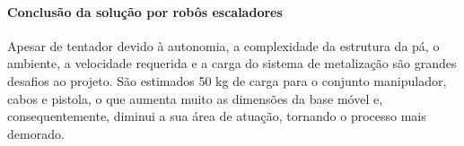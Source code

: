 

\paragraph{Conclusão da solução por robôs escaladores}
Apesar de tentador devido à autonomia, a complexidade da estrutura da pá, o
ambiente, a velocidade requerida e a carga do sistema de metalização são
grandes desafios ao projeto. São estimados 50 kg de
carga para o conjunto manipulador, cabos e pistola, o que aumenta muito as
dimensões da base móvel e, consequentemente, diminui a sua área de atuação,
tornando o processo mais demorado.
